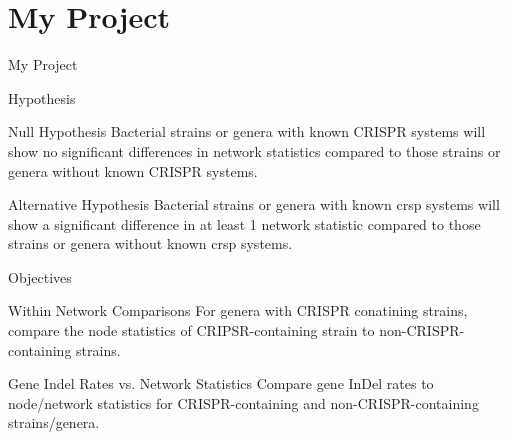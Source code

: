 \documentclass[dvipsnames]{beamer}
\begin{document}
\section{My Project}
\begin{frame}{}
    \begin{center}
        \Huge \textcolor{OliveGreen}{My Project}
    \end{center}
    \addtocounter{framenumber}{-1}
\end{frame}
\begin{frame}[fragile]{Hypothesis}
     \begin{block}{Null Hypothesis}
     Bacterial strains or genera with known CRISPR systems will show no significant differences in network statistics compared to those strains or genera without known CRISPR systems.
    \end{block}
     \begin{block}{Alternative Hypothesis}
     Bacterial strains or genera with known \ac{crsp} systems will show a significant difference in at least 1 network statistic compared to those strains or  genera without known \ac{crsp} systems.
    \end{block}
\end{frame}
\begin{frame}[fragile]{Objectives}
     \begin{block}{Within Network Comparisons}
        For genera with CRISPR conatining strains, compare the node statistics of CRIPSR-containing strain to non-CRISPR-containing strains.
    \end{block}
     \begin{block}{Gene Indel Rates vs. Network Statistics}
        Compare gene InDel rates to node/network statistics for CRISPR-containing and non-CRISPR-containing strains/genera.
    \end{block}
\end{frame}
\end{document}
